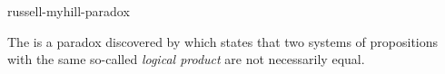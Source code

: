 \documentclass{stex}
\begin{document}
\begin{smodule}{russell-myhill-paradox}
\begin{sparagraph}[style=symdoc]
  The  is a paradox discovered by  which states that two systems of propositions with the same so-called \emph{logical product} are not necessarily equal.
\end{sparagraph}
\end{smodule}
\end{document}
